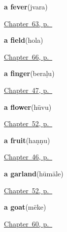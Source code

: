 \noindent\begin{minipage}[t]{\linewidth}
\raggedright
\textbf{a fever}\enspace\emph{}\enspace(jvara)\par
\footnotesize \hyperref[ch:ka-health]{Chapter~63, p.~\pageref*{ch:ka-health}}
\end{minipage}\par\smallskip

\noindent\begin{minipage}[t]{\linewidth}
\raggedright
\textbf{a field}\enspace\emph{}\enspace(hola)\par
\footnotesize \hyperref[ch:ka-field]{Chapter~66, p.~\pageref*{ch:ka-field}}
\end{minipage}\par\smallskip

\noindent\begin{minipage}[t]{\linewidth}
\raggedright
\textbf{a finger}\enspace\emph{}\enspace(beraḷu)\par
\footnotesize \hyperref[ch:ka-body-more]{Chapter~47, p.~\pageref*{ch:ka-body-more}}
\end{minipage}\par\smallskip

\noindent\begin{minipage}[t]{\linewidth}
\raggedright
\textbf{a flower}\enspace\emph{}\enspace(hūvu)\par
\footnotesize \hyperref[ch:ka-welcome]{Chapter~52, p.~\pageref*{ch:ka-welcome}}
\end{minipage}\par\smallskip

\noindent\begin{minipage}[t]{\linewidth}
\raggedright
\textbf{a fruit}\enspace\emph{}\enspace(haṇṇu)\par
\footnotesize \hyperref[ch:ka-ask-for]{Chapter~46, p.~\pageref*{ch:ka-ask-for}}
\end{minipage}\par\smallskip

\noindent\begin{minipage}[t]{\linewidth}
\raggedright
\textbf{a garland}\enspace\emph{}\enspace(hūmāle)\par
\footnotesize \hyperref[ch:ka-welcome]{Chapter~52, p.~\pageref*{ch:ka-welcome}}
\end{minipage}\par\smallskip

\noindent\begin{minipage}[t]{\linewidth}
\raggedright
\textbf{a goat}\enspace\emph{}\enspace(mēke)\par
\footnotesize \hyperref[ch:ka-animals]{Chapter~60, p.~\pageref*{ch:ka-animals}}
\end{minipage}\par\smallskip


